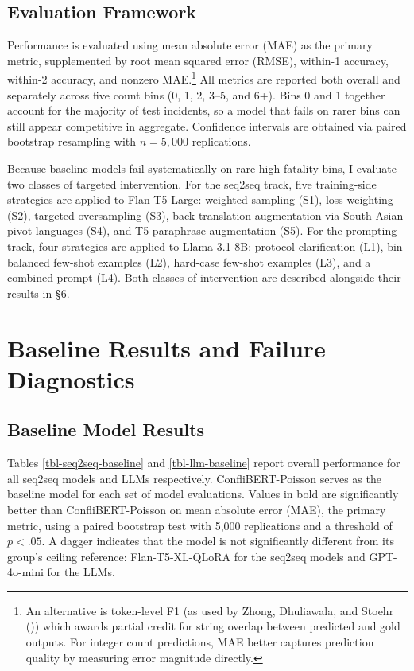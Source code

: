 \documentclass[
  11pt,
]{article}
\begin{document}
\subsection{Evaluation Framework}\label{evaluation-framework}

Performance is evaluated using mean absolute error (MAE) as the primary
metric, supplemented by root mean squared error (RMSE), within-1
accuracy, within-2 accuracy, and nonzero MAE.\footnote{An alternative is
  token-level F1 (as used by Zhong, Dhuliawala, and Stoehr
  ()) which awards partial credit for
  string overlap between predicted and gold outputs. For integer count
  predictions, MAE better captures prediction quality by measuring error
  magnitude directly.} All metrics are reported both overall and
separately across five count bins (0, 1, 2, 3--5, and 6+). Bins 0 and 1
together account for the majority of test incidents, so a model that
fails on rarer bins can still appear competitive in aggregate.
Confidence intervals are obtained via paired bootstrap resampling with
\(n = 5{,}000\) replications.

Because baseline models fail systematically on rare high-fatality bins,
I evaluate two classes of targeted intervention. For the seq2seq track,
five training-side strategies are applied to Flan-T5-Large: weighted
sampling (S1), loss weighting (S2), targeted oversampling (S3),
back-translation augmentation via South Asian pivot languages (S4), and
T5 paraphrase augmentation (S5). For the prompting track, four
strategies are applied to Llama-3.1-8B: protocol clarification (L1),
bin-balanced few-shot examples (L2), hard-case few-shot examples (L3),
and a combined prompt (L4). Both classes of intervention are described
alongside their results in §6.

\section{Baseline Results and Failure
Diagnostics}\label{baseline-results-and-failure-diagnostics}

\subsection{Baseline Model Results}\label{baseline-model-results}

Tables \ref{tbl-seq2seq-baseline} and \ref{tbl-llm-baseline} report
overall performance for all seq2seq models and LLMs respectively.
ConfliBERT-Poisson serves as the baseline model for each set of model
evaluations. Values in bold are significantly better than
ConfliBERT-Poisson on mean absolute error (MAE), the primary metric,
using a paired bootstrap test with 5,000 replications and a threshold of
\(p < .05\). A dagger indicates that the model is not significantly
different from its group's ceiling reference: Flan-T5-XL-QLoRA for the
seq2seq models and GPT-4o-mini for the LLMs.
\end{document}
